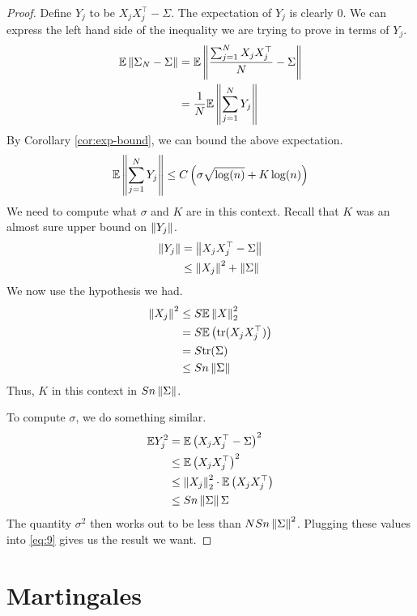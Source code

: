 \documentclass[11pt]{article}
\begin{document}
\begin{proof}
  Define $Y_j$ to be $X_j X_j^{\top} - \Sigma$.
  The expectation of $Y_j$ is clearly $0$.
  We can express the left hand side of the inequality we are trying to prove in terms of $Y_j$.
  \begin{align*}
    \mathbb{E} \left\lVert\Sigma_N - \Sigma\right\rVert &= \mathbb{E} \left\lVert \frac{\sum_{j=1}^N X_jX_j^{\top}}{N} - \Sigma \right\rVert \\
                                &= \frac{1}{N} \mathbb{E} \left\lVert\sum_{j=1}^N Y_j\right\rVert
  \end{align*}
  By Corollary \ref{cor:exp-bound}, we can bound the above expectation.
  \begin{align}
    \label{eq:9}
    \mathbb{E} \left\lVert\sum_{j=1}^N Y_j\right\rVert
    \leq C\left( \sigma \sqrt{\log(n)} + K \log(n) \right)
  \end{align}
  We need to compute what $\sigma$ and $K$ are in this context.
  Recall that $K$ was an almost sure upper bound on $\left\lVert Y_j\right\rVert$.
  \begin{align*}
    \left\lVert Y_j\right\rVert &= \left\lVert X_jX_j^{\top} - \Sigma\right\rVert \\
               &\leq \left\lVert X_j\right\rVert^2 + \left\lVert\Sigma\right\rVert
  \end{align*}
  We now use the hypothesis we had.
  \begin{align*}
    \left\lVert X_j\right\rVert^2 &\leq S \mathbb{E}\left\lVert X\right\rVert_2^2 \\
                 &=S \mathbb{E}\left( \mathrm{tr}(X_j X_j^{\top}) \right) \\
                 &= S \mathrm{tr}(\Sigma) \\
                 &\leq Sn \left\lVert\Sigma\right\rVert
  \end{align*}
  Thus, $K$ in this context in $S n \left\lVert\Sigma\right\rVert$.

  To compute $\sigma$, we do something similar.
  \begin{align*}
    \mathbb{E} Y_j^2 &= \mathbb{E}\left( X_jX_j^{\top} - \Sigma \right)^2 \\
             &\leq \mathbb{E}\left( X_j X_j^{\top} \right)^2 \\
             &\leq \left\lVert X_j\right\rVert_2^2 \cdot \mathbb{E} \left( X_j X_j^\top \right) \\
             &\leq Sn \left\lVert\Sigma\right\rVert \Sigma
  \end{align*}
  The quantity $\sigma^2$ then works out to be less than $N S n \left\lVert\Sigma\right\rVert^2$.
  Plugging these values into \eqref{eq:9} gives us the result we want.
\end{proof}

\section{Martingales}
\label{sec:martingales}
\end{document}
